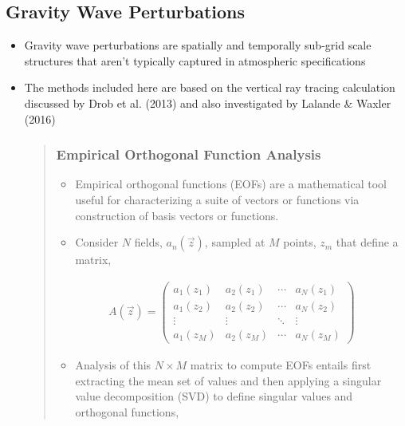 \documentclass[letterpaper,10pt,english]{sphinxmanual}
\begin{document}
\subsection{Gravity Wave Perturbations}
\label{\detokenize{analysis:gravity}}\begin{itemize}
\item {} 
Gravity wave perturbations are spatially and temporally sub-grid scale structures that aren’t typically captured in atmospheric specifications

\item {} 
The methods included here are based on the vertical ray tracing calculation discussed by Drob et al. (2013) and also investigated by Lalande \& Waxler (2016)
\begin{quote}


\subsubsection{Empirical Orthogonal Function Analysis}
\label{\detokenize{eofs:empirical-orthogonal-function-analysis}}\label{\detokenize{eofs:eofs}}\label{\detokenize{eofs::doc}}\begin{itemize}
\item {} 
Empirical orthogonal functions (EOFs) are a mathematical tool useful for characterizing a suite of vectors or functions via construction of basis vectors or functions.

\item {} 
Consider \(N\) fields, \(a_n (\vec{z})\), sampled at \(M\) points, \(z_m\) that define a matrix,

\end{itemize}
\begin{equation*}
\begin{split}A \left( \vec{z} \right) =
\begin{pmatrix}
a_1 \left( z_1 \right) & a_2 \left( z_1 \right)     & \cdots        & a_N \left( z_1 \right) \\
a_1 \left( z_2 \right) & a_2 \left( z_2 \right)     & \cdots        & a_N \left( z_2 \right) \\
\vdots                              & \vdots                                        & \ddots        & \vdots         \\
a_1 \left( z_M \right) & a_2 \left( z_M \right)     & \cdots        & a_N \left( z_M \right)
\end{pmatrix}\end{split}
\end{equation*}\begin{itemize}
\item {} 
Analysis of this \(N \times M\) matrix to compute EOFs entails first extracting the mean set of values and then applying a singular value decomposition (SVD) to define singular values and orthogonal functions,


\end{itemize}
\end{quote}
\end{itemize}
\end{document}
